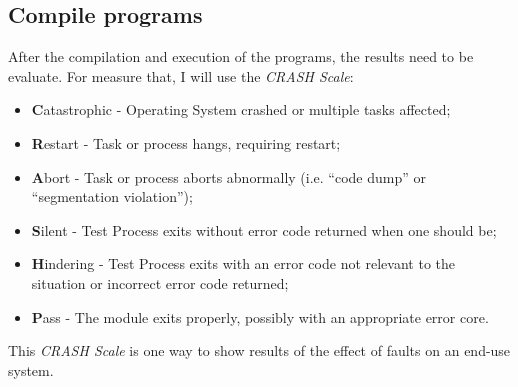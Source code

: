 \subsection{Compile programs}



After the compilation and execution of the programs, the results need to be evaluate. For measure that, I will use the \textit{CRASH Scale}\cite{koopman1997comparing}:

\begin{itemize}
	\item \textbf{C}atastrophic - Operating System crashed or multiple tasks affected;
	\item \textbf{R}estart - Task or process hangs, requiring restart;
	\item \textbf{A}bort - Task or process aborts abnormally (i.e. ``code dump'' or ``segmentation violation'');
	\item \textbf{S}ilent - Test Process exits without error code returned when one should be;
	\item \textbf{H}indering - Test Process exits with an error code not relevant to the situation or incorrect error code returned;
	\item \textbf{P}ass - The module exits properly, possibly with an appropriate error core.
\end{itemize}

This \textit{CRASH Scale} is one way to show results of the effect of faults on an end-use system.